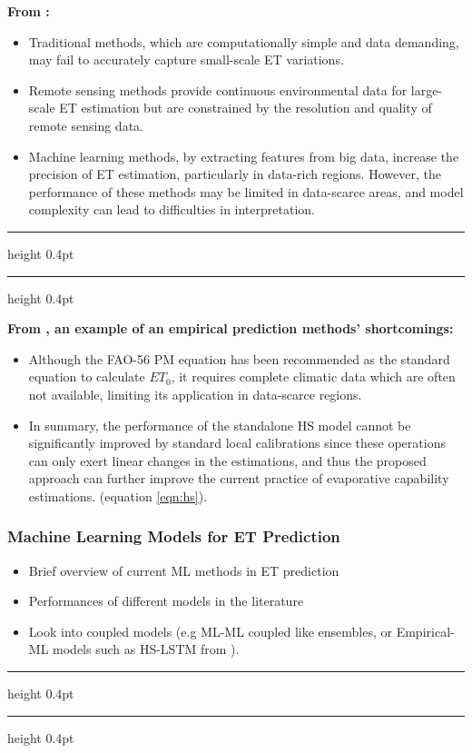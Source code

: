 \documentclass[paper=a4, fontsize=12pt]{scrartcl}
\newcommand{\notedivider}{%
	\vspace{4pt}%
	{\hrule height 0.4pt}%
	\vspace{6pt}%
	{\hrule height 0.4pt}
	\vspace{6pt}
}
\begin{document}
	\textbf{From \citep{xue2025review}:} 
	\begin{itemize}
		\item Traditional methods, which are computationally simple and data demanding, may fail to accurately capture small-scale ET variations. 
		\item Remote sensing methods provide continuous environmental data for large-scale ET estimation but are constrained by the resolution and quality of remote sensing data. 
		\item Machine learning methods, by extracting features from big data, increase the precision of ET estimation, particularly in data-rich regions. However, the performance of these methods may be limited in data-scarce areas, and model complexity can lead to difficulties in interpretation.
	\end{itemize}
	\notedivider
	\textbf{From \citep{yan2023deep}, an example of an empirical prediction methods' shortcomings:}
	\begin{itemize}
		\item Although the FAO-56 PM equation has been recommended as the standard equation to calculate $ET_0$, it requires complete climatic data which are often not available, limiting its application in data-scarce regions.
		\item In summary, the performance of the standalone HS model cannot be significantly improved by standard local calibrations since these operations can only exert linear changes in the estimations, and thus the proposed approach can further improve the current practice of evaporative capability estimations. (equation \ref{eqn:hs}).
	\end{itemize} 
	
	
	\newpage
	\subsubsection{Machine Learning Models for ET Prediction}
	\begin{itemize}
		\item Brief overview of current ML methods in ET prediction
		\item Performances of different models in the literature 
		\item Look into coupled models (e.g ML-ML coupled like ensembles, or Empirical-ML models such as HS-LSTM from \cite{yan2023deep}).
	\end{itemize}
	\notedivider
	
\end{document}
